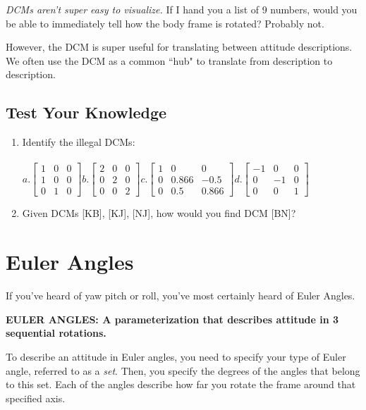 \documentclass[a4paper,14pt]{extreport}
\begin{document}
\emph{DCMs aren't super easy to visualize.} If I hand you a list of 9 numbers, would you be able to immediately tell how the body frame is rotated? Probably not.

However, the DCM is super useful for translating between attitude descriptions. We often use the DCM as a common ``hub" to translate from description to description.

\section{Test Your Knowledge}
\begin{enumerate}
\item Identify the illegal DCMs:\\\\
	$
	a.
	\begin{bmatrix}
			1&0&0\\
			1&0&0\\
			0&1&0
	\end{bmatrix} 
	b.	
	\begin{bmatrix}
			2&0&0\\
			0&2&0\\
			0&0&2
	\end{bmatrix}
	c.	
	\begin{bmatrix}
			1&0&0\\
			0&0.866&-0.5\\
			0&0.5&0.866
	\end{bmatrix}
	d.
	\begin{bmatrix}
			-1&0&0\\
			0&-1&0\\
			0&0&1
	\end{bmatrix}$ 
\item{Given DCMs [KB], [KJ], [NJ], how would you find DCM [BN]?}
\end{enumerate}

\chapter{Euler Angles}

If you've heard of yaw pitch or roll, you've most certainly heard of Euler Angles.
\begin{center}
\textbf{EULER ANGLES: A parameterization that describes attitude in 3 sequential rotations.}
\end{center}

To describe an attitude in Euler angles, you need to specify your type of Euler angle, referred to as a \emph{set}. Then, you specify the degrees of the angles that belong to this set. Each of the angles describe how far you rotate the frame around that specified axis. 
\end{document}
